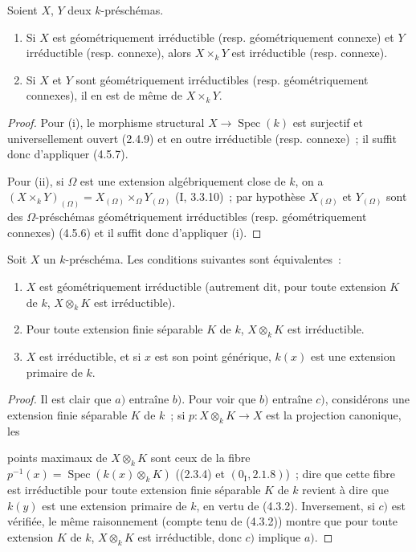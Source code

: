 \begin{corollary}[4.5.8]
\label{IV.2.4.5.8-fr}
Soient $X$, $Y$ deux $k$-préschémas.
\begin{enumerate}
\item[(i)] Si $X$ est géométriquement irréductible (resp. géométriquement
connexe) et $Y$ irréductible (resp. connexe), alors $X\times_k Y$ est
irréductible (resp. connexe).
\item[(ii)] Si $X$ et $Y$ sont géométriquement irréductibles (resp.
géométriquement connexes), il en est de même de $X\times_k Y$.
\end{enumerate}
\end{corollary}

\begin{proof}
Pour (i), le morphisme structural $X\to\operatorname{Spec}(k)$ est surjectif et
universellement ouvert (2.4.9) et en outre irréductible (resp. connexe)~; il
suffit donc d'appliquer (4.5.7).

Pour (ii), si $\Omega$ est une extension algébriquement close de $k$, on a
$(X\times_k Y)_{(\Omega)}=X_{(\Omega)}\times_\Omega Y_{(\Omega)}$
(I, 3.3.10)~; par hypothèse $X_{(\Omega)}$ et $Y_{(\Omega)}$ sont des
$\Omega$-préschémas géométriquement irréductibles (resp. géométriquement
connexes) (4.5.6) et il suffit donc d'appliquer (i).
\end{proof}

\begin{proposition}[4.5.9]
\label{IV.2.4.5.9-fr}
Soit $X$ un $k$-préschéma. Les conditions suivantes sont équivalentes~:
\begin{enumerate}
\item[$a)$] $X$ est géométriquement irréductible (autrement dit, pour toute
extension $K$ de $k$, $X\otimes_k K$ est irréductible).
\item[$b)$] Pour toute extension finie séparable $K$ de $k$, $X\otimes_k K$
est irréductible.
\item[$c)$] $X$ est irréductible, et si $x$ est son point générique, $k(x)$
est une extension primaire de $k$.
\end{enumerate}
\end{proposition}

\begin{proof}
Il est clair que $a)$ entraîne $b)$. Pour voir que $b)$ entraîne $c)$,
considérons une extension finie séparable $K$ de $k$~; si
$p:X\otimes_k K\to X$ est la projection canonique, les


points maximaux de $X\otimes_k K$ sont ceux de la fibre
$p^{-1}(x)=\operatorname{Spec}(k(x)\otimes_k K)$ ((2.3.4) et
$(0_{\mathrm I},2.1.8)$)~; dire que cette fibre est irréductible pour toute
extension finie séparable $K$ de $k$ revient à dire que $k(y)$ est une
extension primaire de $k$, en vertu de (4.3.2). Inversement, si $c)$ est
vérifiée, le même raisonnement (compte tenu de (4.3.2)) montre que pour toute
extension $K$ de $k$, $X\otimes_k K$ est irréductible, donc $c)$ implique
$a)$.
\end{proof}

